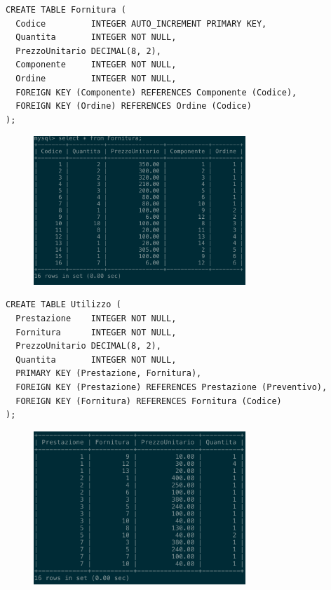     \begin{lstlisting}
CREATE TABLE Fornitura (
  Codice         INTEGER AUTO_INCREMENT PRIMARY KEY,
  Quantita       INTEGER NOT NULL,
  PrezzoUnitario DECIMAL(8, 2),
  Componente     INTEGER NOT NULL,
  Ordine         INTEGER NOT NULL,
  FOREIGN KEY (Componente) REFERENCES Componente (Codice),
  FOREIGN KEY (Ordine) REFERENCES Ordine (Codice)
);
    \end{lstlisting}
    \begin{figure}[H]
      \centering
      \includegraphics[width=8cm]{images/screenshots/schema/fornitura.png}
    \end{figure}

    \begin{lstlisting}
CREATE TABLE Utilizzo (
  Prestazione    INTEGER NOT NULL,
  Fornitura      INTEGER NOT NULL,
  PrezzoUnitario DECIMAL(8, 2),
  Quantita       INTEGER NOT NULL,
  PRIMARY KEY (Prestazione, Fornitura),
  FOREIGN KEY (Prestazione) REFERENCES Prestazione (Preventivo),
  FOREIGN KEY (Fornitura) REFERENCES Fornitura (Codice)
);
    \end{lstlisting}
    \begin{figure}[H]
      \centering
      \includegraphics[width=8cm]{images/screenshots/schema/utilizzo.png}
    \end{figure}

